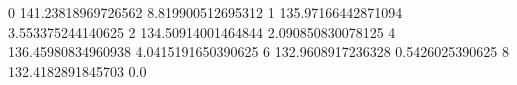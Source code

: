 0 141.23818969726562 8.819900512695312
1 135.97166442871094 3.553375244140625
2 134.50914001464844 2.090850830078125
4 136.45980834960938 4.0415191650390625
6 132.9608917236328 0.5426025390625
8 132.4182891845703 0.0
